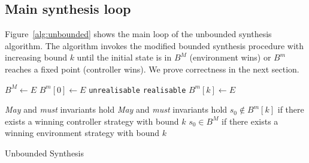 \subsection{Main synthesis loop}

Figure~\ref{alg:unbounded} shows the main loop of the unbounded synthesis algorithm.  The algorithm invokes the modified bounded synthesis procedure with increasing bound $k$ until the initial state is in $B^M$ (environment wins) or $B^m$ reaches a fixed point (controller wins). We prove correctness in the next section.

\begin{algorithm}[h]
    \begin{algorithmic}[1]
            \State $B^M \gets E$
            \State $B^m[0] \gets E$
                    \State \Return \texttt{unrealisable} 
                \EndIf
                    \State \Return \texttt{realisable} 
                \EndIf
                \State $B^m[k] \gets E$
                \State {}
            \EndFor
        \EndFunction
    \end{algorithmic}

    \begin{algorithmic}
        \Require \emph{May} and \emph{must} invariants hold
        \Ensure \emph{May} and \emph{must} invariants hold
        \Ensure $s_0 \not\in B^m[k]$ if there exists a winning controller strategy with bound $k$
        \Ensure $s_0 \in B^M$ if there exists a winning environment strategy with bound $k$
            \State \Return {}
        \EndFunction
    \end{algorithmic}
    \caption{Unbounded Synthesis}
    \label{alg:unbounded}
\end{algorithm}




